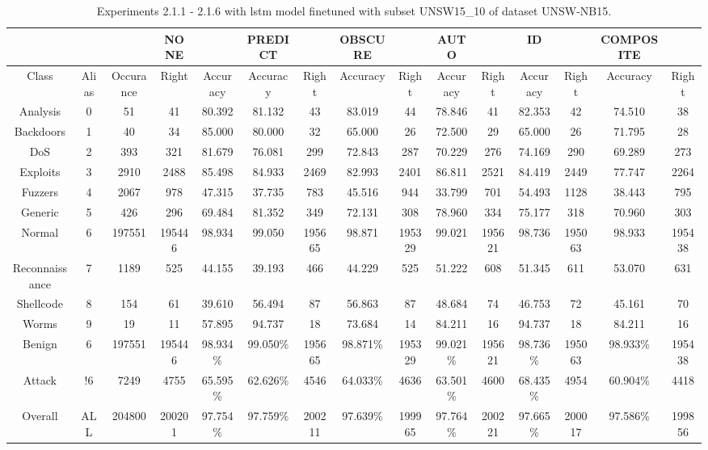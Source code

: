 \begin{table}[htb]
    \centering
    \begin{tabular}{@{}ccccccccccccccc@{}}
        \toprule
         &  &  & NONE &  & PREDICT &  & OBSCURE &  & AUTO &  & ID &  & COMPOSITE &  \\
        \midrule
        Class &  Alias &  Occurance &  Right &  Accuracy &  Accuracy &  Right &  Accuracy &  Right &  Accuracy &  Right &  Accuracy &  Right &  Accuracy &  Right \\
        Analysis &  0 &  51 &  41 &  80.392 &  81.132 &  43 &  83.019 &  44 &  78.846 &  41 &  82.353 &  42 &  74.510 &  38 \\
        Backdoors &  1 &  40 &  34 &  85.000 &  80.000 &  32 &  65.000 &  26 &  72.500 &  29 &  65.000 &  26 &  71.795 &  28 \\
        DoS &  2 &  393 &  321 &  81.679 &  76.081 &  299 &  72.843 &  287 &  70.229 &  276 &  74.169 &  290 &  69.289 &  273 \\
        Exploits &  3 &  2910 &  2488 &  85.498 &  84.933 &  2469 &  82.993 &  2401 &  86.811 &  2521 &  84.419 &  2449 &  77.747 &  2264 \\
        Fuzzers &  4 &  2067 &  978 &  47.315 &  37.735 &  783 &  45.516 &  944 &  33.799 &  701 &  54.493 &  1128 &  38.443 &  795 \\
        Generic &  5 &  426 &  296 &  69.484 &  81.352 &  349 &  72.131 &  308 &  78.960 &  334 &  75.177 &  318 &  70.960 &  303 \\
        Normal &  6 &  197551 &  195446 &  98.934 &  99.050 &  195665 &  98.871 &  195329 &  99.021 &  195621 &  98.736 &  195063 &  98.933 &  195438 \\
        Reconnaissance &  7 &  1189 &  525 &  44.155 &  39.193 &  466 &  44.229 &  525 &  51.222 &  608 &  51.345 &  611 &  53.070 &  631 \\
        Shellcode &  8 &  154 &  61 &  39.610 &  56.494 &  87 &  56.863 &  87 &  48.684 &  74 &  46.753 &  72 &  45.161 &  70 \\
        Worms &  9 &  19 &  11 &  57.895 &  94.737 &  18 &  73.684 &  14 &  84.211 &  16 &  94.737 &  18 &  84.211 &  16 \\
        Benign &  6 &  197551 &  195446 &  98.934\% &  99.050\% &  195665 &  98.871\% &  195329 &  99.021\% &  195621 &  98.736\% &  195063 &  98.933\% &  195438 \\
        Attack &  !6 &  7249 &  4755 &  65.595\% &  62.626\% &  4546 &  64.033\% &  4636 &  63.501\% &  4600 &  68.435\% &  4954 &  60.904\% &  4418 \\
        Overall &  ALL &  204800 &  200201 &  97.754\% &  97.759\% &  200211 &  97.639\% &  199965 &  97.764\% &  200221 &  97.665\% &  200017 &  97.586\% &  199856 \\
        \bottomrule
    \end{tabular}
    \caption{Experiments 2.1.1 - 2.1.6 with \gls{lstm} model finetuned with subset UNSW15\_10 of dataset UNSW-NB15.}
    \label{table:results:lstm:flows15_subset}
\end{table}